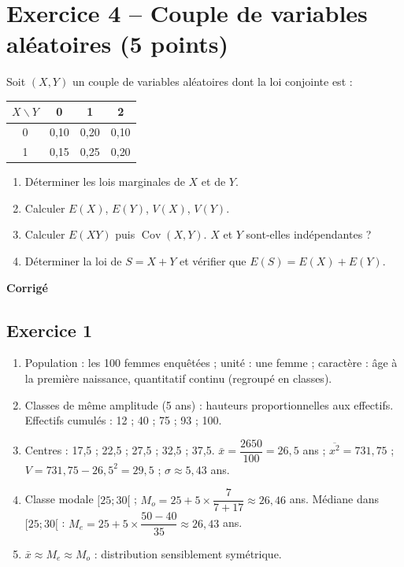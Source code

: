 \documentclass[11pt,a4paper]{article}
\begin{document}
\section*{Exercice 4 -- Couple de variables aléatoires (5 points)}
Soit $(X,Y)$ un couple de variables aléatoires dont la loi conjointe est :
\begin{center}
\begin{tabular}{c|ccc}
$X \backslash Y$ & 0 & 1 & 2\\ \hline
0 & 0{,}10 & 0{,}20 & 0{,}10\\
1 & 0{,}15 & 0{,}25 & 0{,}20
\end{tabular}
\end{center}
\begin{enumerate}
  \item Déterminer les lois marginales de $X$ et de $Y$.
  \item Calculer $E(X)$, $E(Y)$, $V(X)$, $V(Y)$.
  \item Calculer $E(XY)$ puis $\operatorname{Cov}(X,Y)$. $X$ et $Y$ sont-elles indépendantes ?
  \item Déterminer la loi de $S = X + Y$ et vérifier que $E(S) = E(X) + E(Y)$.
\end{enumerate}

\newpage
\begin{center}{\Large\bfseries Corrigé}\end{center}

\subsection*{Exercice 1}
\begin{enumerate}
  \item Population : les 100 femmes enquêtées ; unité : une femme ; caractère : âge à la première naissance, quantitatif continu (regroupé en classes).
  \item Classes de même amplitude (5 ans) : hauteurs proportionnelles aux effectifs. Effectifs cumulés : 12 ; 40 ; 75 ; 93 ; 100.
  \item Centres : 17,5 ; 22,5 ; 27,5 ; 32,5 ; 37,5.
  $\bar{x} = \dfrac{2650}{100} = 26{,}5$ ans ; $\overline{x^2} = 731{,}75$ ;
  $V = 731{,}75 - 26{,}5^2 = 29{,}5$ ; $\sigma \approx 5{,}43$ ans.
  \item Classe modale $[25;30[$ ; $M_o = 25 + 5\times\dfrac{7}{7+17} \approx 26{,}46$ ans.
  Médiane dans $[25;30[$ : $M_e = 25 + 5\times\dfrac{50-40}{35} \approx 26{,}43$ ans.
  \item $\bar{x} \approx M_e \approx M_o$ : distribution sensiblement symétrique.
\end{enumerate}
\end{document}
